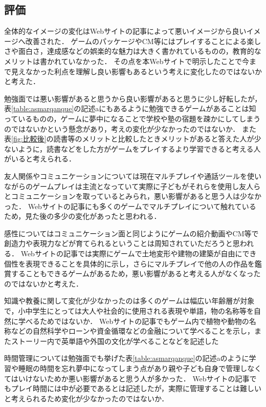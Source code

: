 \documentclass[12pt,a4j,titlepage]{ltjsarticle}
\begin{document}
\subsection{評価}
全体的なイメージの変化はWebサイトの記事によって悪いイメージから良いイメージへ改善された．
ゲームのパッケージやCM等にはプレイすることによる楽しさや面白さ，達成感などの娯楽的な魅力は大きく書かれているものの，教育的なメリットは書かれていなかった．
その点を本Webサイトで明示したことで今まで見えなかった利点を理解し良い影響もあるという考えに変化したのではないかと考えた．


勉強面では悪い影響があると思うから良い影響があると思うに少し好転したが，表\ref{table:asmarqanque}の記述aにもあるように勉強できるゲームがあることは知っているものの，ゲームに夢中になることで学校や塾の宿題を疎かにしてしまうのではないかという懸念があり，考えの変化が少なかったのではないか．
また表\ref{fig:比較後}の読書等のメリットと比較したときメリットがあると答えた人が少ないように，読書などをした方がゲームをプレイするより学習できると考える人がいると考えられる．

友人関係やコミュニケーションについては現在マルチプレイや通話ツールを使いながらのゲームプレイは主流となっていて実際に子どもがそれらを使用し友人らとコミュニケーションを取っているとみられ，悪い影響があると思う人は少なかった．
Webサイトの記事にも多くのゲームでマルチプレイについて触れているため，見た後の多少の変化があったと思われる．

感性についてはコミュニケーション面と同じようにゲームの紹介動画やCM等で創造力や表現力などが育てられるということは周知されていただろうと思われる．
Webサイトの記事では実際にゲームで土地変形や建物の建築が自由にでき個性を表現できることを具体的に示し，さらにマルチプレイで他の人の作品を鑑賞することもできるゲームがあるため，悪い影響があると考える人がなくなったのではないかと考えた．

知識や教養に関して変化が少なかったのは多くのゲームは幅広い年齢層が対象で，小中学生にとっては大人や社会的に使用される表現や単語，物の名称等を自然に学べるためではないか．
Webサイトの記事でもゲーム内で植物や動物の名称などの自然科学やローンや資金循環などの金融について学べることを示し，またストーリー内で英単語や外国の文化が学べることなどを記述した

時間管理については勉強面でも挙げた表\ref{table:asmarqanque}の記述aのように学習や睡眠の時間を忘れ夢中になってしまう点があり親や子ども自身で管理しなくてはいけないためか悪い影響があると思う人が多かった．
Webサイトの記事でもプレイ時間には中が必要であるとは記述したが，実際に管理することは難しいと考えられるため変化が少なかったのではないか．
\end{document}
